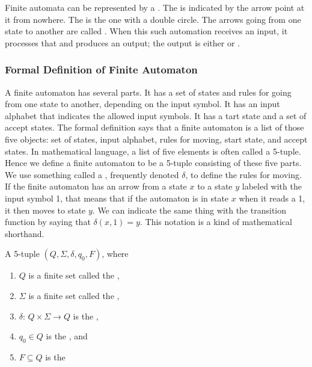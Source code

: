\documentclass{article}
\begin{document}
Finite automata can be represented by a . The  is indicated by the arrow point at it from nowhere. The  is the one with a double circle. The arrows going from one state to another are called . When this such automation receives an input, it processes that and produces an output; the output is either  or . 

\subsubsection{Formal Definition of Finite Automaton}

A finite automaton has several parts. It has a set of states and rules for going from one state to another, depending on the input symbol. It has an input alphabet that indicates the allowed input symbols. It has a tart state and a set of accept states. The formal definition says that a finite automaton is a list of those five objects: set of states, input alphabet, rules for moving, start state, and accept states. In mathematical language, a list of five elements is often called a 5-tuple. Hence we define a finite automaton to be a 5-tuple consisting of these five parts. \\

We use something called a , frequently denoted $\delta$, to define the rules for moving. If the finite automaton has an arrow from a state $x$ to a state $y$ labeled with the input symbol 1, that means that if the automaton is in state $x$ when it reads a 1, it then moves to state $y$. We can indicate the same thing with the transition function by saying that $\delta(x,1) = y$. This notation is a kind of mathematical shorthand. \\ 

\begin{definition} A 5-tuple $(Q,\Sigma,\delta,q_{0},F)$, where 
\begin{enumerate}
  \item $Q$ is a finite set called the ,
  \item $\Sigma$ is a finite set called the ,
  \item $\delta$: $Q \times \Sigma \rightarrow Q$ is the ,
  \item $q_{0} \in Q$ is the , and 
  \item $F \subseteq Q$ is the  
\end{enumerate}
\end{definition}
\end{document}
